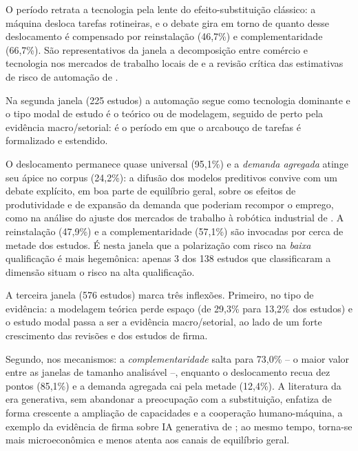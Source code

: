 O período retrata a tecnologia pela lente do efeito-substituição clássico: a máquina desloca tarefas rotineiras, e o debate gira em torno de quanto desse deslocamento é compensado por reinstalação (46,7\%) e complementaridade (66,7\%). São representativos da janela a decomposição entre comércio e tecnologia nos mercados de trabalho locais de \textcite{autorDornHanson2015} e a revisão crítica das estimativas de risco de automação de \textcite{arntzGregoryZierahn2017}.


Na segunda janela (225 estudos) a automação segue como tecnologia dominante e o tipo modal de estudo é o teórico ou de modelagem, seguido de perto pela evidência macro/setorial: é o período em que o arcabouço de tarefas é formalizado e estendido. 

O deslocamento permanece quase universal (95,1\%) e a \emph{demanda agregada} atinge seu ápice no corpus (24,2\%): a difusão dos modelos preditivos convive com um debate explícito, em boa parte de equilíbrio geral, sobre os efeitos de produtividade e de expansão da demanda que poderiam recompor o emprego, como na análise do ajuste dos mercados de trabalho à robótica industrial de \textcite{dauth2021}. A reinstalação (47,9\%) e a complementaridade (57,1\%) são invocadas por cerca de metade dos estudos. É nesta janela que a polarização com risco na \emph{baixa} qualificação é mais hegemônica: apenas 3 dos 138 estudos que classificaram a dimensão situam o risco na alta qualificação.


A terceira janela (576 estudos) marca três inflexões. Primeiro, no tipo de evidência: a modelagem teórica perde espaço (de 29,3\% para 13,2\% dos estudos) e o estudo modal passa a ser a evidência macro/setorial, ao lado de um forte crescimento das revisões e dos estudos de firma. 

Segundo, nos mecanismos: a \emph{complementaridade} salta para 73,0\% -- o maior valor entre as janelas de tamanho analisável --, enquanto o deslocamento recua dez pontos (85,1\%) e a demanda agregada cai pela metade (12,4\%). A literatura da era generativa, sem abandonar a preocupação com a substituição, enfatiza de forma crescente a ampliação de capacidades e a cooperação humano-máquina, a exemplo da evidência de firma sobre IA generativa de \textcite{brynjolfssonLiRaymond2025}; ao mesmo tempo, torna-se mais microeconômica e menos atenta aos canais de equilíbrio geral.


